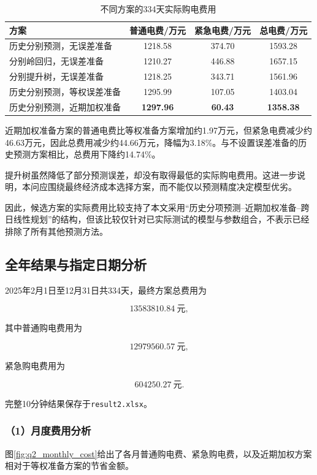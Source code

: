 \begin{table}[htbp]
\centering
\caption{不同方案的334天实际购电费用}
\label{tab:q2_model_compare}
\begin{tabular}{lccc}
\hline
方案 & 普通电费/万元 & 紧急电费/万元 & 总电费/万元 \\
\hline
历史分别预测，无误差准备
& 1218.58 & 374.70 & 1593.28 \\
分别岭回归，无误差准备
& 1210.27 & 446.88 & 1657.15 \\
分别提升树，无误差准备
& 1218.25 & 343.71 & 1561.96 \\
历史分别预测，等权误差准备
& 1295.99 & 107.05 & 1403.04 \\
历史分别预测，近期加权准备
& \textbf{1297.96} & \textbf{60.43} & \textbf{1358.38} \\
\hline
\end{tabular}
\end{table}

近期加权准备方案的普通电费比等权准备方案增加约1.97万元，但紧急电费减少约46.63万元，因此总费用减少约44.66万元，降幅为3.18\%。与不设置误差准备的历史预测方案相比，总费用下降约14.74\%。

提升树虽然降低了部分预测误差，却没有取得最低的实际购电费用。这进一步说明，本问应围绕最终经济成本选择方案，而不能仅以预测精度决定模型优劣。

因此，候选方案的实际费用比较支持了本文采用“历史分项预测--近期加权准备--跨日线性规划”的结构，但该比较仅针对已实际测试的模型与参数组合，不表示已经排除了所有其他预测方法。


\subsection{全年结果与指定日期分析}

2025年2月1日至12月31日共334天，最终方案总费用为

\[
\boxed{13583810.84\ \text{元}},
\]

其中普通购电费用为

\[
12979560.57\ \text{元},
\]

紧急购电费用为

\[
604250.27\ \text{元}.
\]

完整10分钟结果保存于\texttt{result2.xlsx}。


\subsubsection*{（1）月度费用分析}

图\ref{fig:q2_monthly_cost}给出了各月普通购电费、紧急购电费，以及近期加权方案相对于等权准备方案的节省金额。

